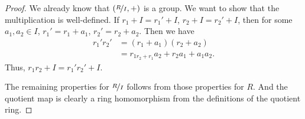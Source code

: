 \begin{proof}
    We already know that \((\nicefrac{R}{I}, +)\) is a group. We want to show that the multiplication is well-defined. If \(r_1 + I = r_1' + I\), \(r_2 + I = r_2' + I\), then for some \(a_1, a_2 \in I\), \(r_1' = r_1 + a_1\), \(r_2' = r_2 + a_2\). Then we have
    \begin{align*}
        r_1'r_2' &= (r_1 + a_1)(r_2 + a_2)\\
        &=r_{1r_2 + r_{1}}a_2 + r_2 a_1 + a_1 a_2.
    \end{align*}
    Thus, \(r_{1}r_2 + I = r_1'r_2' + I\).

    The remaining properties for \(\nicefrac{R}{I}\) follows from those properties for \(R\). And the quotient map is clearly a ring homomorphism from the definitions of the quotient ring.
\end{proof}
